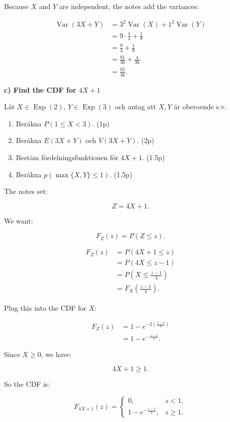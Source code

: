 \documentclass[10pt]{article}
\begin{document}
Because \(X\) and \(Y\) are independent,
the notes add the variances:

\begin{align*}
\operatorname{Var}(3X+Y)
&=3^2\operatorname{Var}(X)
  +1^2\operatorname{Var}(Y) \\[2mm]
&=9\cdot \frac{1}{4}
  +\frac{1}{9} \\[2mm]
&=\frac{9}{4}+\frac{1}{9} \\[2mm]
&=\frac{81}{36}
  +\frac{4}{36} \\[2mm]
&=\frac{85}{36}.
\end{align*}

\textbf{c) Find the CDF for \(4X+1\)}

Låt \(X \in \operatorname{Exp}(2)\),
\(Y \in \operatorname{Exp}(3)\) och antag att
\(X, Y\) är oberoende s.v.

\begin{enumerate}[label=\alph*)]
\item Beräkna \(P(1 \leq X < 3)\). \hfill (1p)
\item Beräkna \(E(3X+Y)\) och \(V(3X+Y)\). \hfill (2p)
\item Bestäm fördelningsfunktionen för \(4X+1\). \hfill (1.5p)
\item Beräkna \(p(\max\{X,Y\}\leq 1)\). \hfill (1.5p)
\end{enumerate}

The notes set:

\[
Z=4X+1.
\]

We want:

\[
F_Z(z)=P(Z\leq z).
\]

\begin{align*}
F_Z(z)
&=P(4X+1\leq z) \\[2mm]
&=P(4X\leq z-1) \\[2mm]
&=P\left(X\leq \frac{z-1}{4}\right) \\[2mm]
&=F_X\left(\frac{z-1}{4}\right).
\end{align*}

Plug this into the CDF for \(X\):

\begin{align*}
F_Z(z)
&=1-e^{-2\left(\frac{z-1}{4}\right)} \\[2mm]
&=1-e^{-\frac{z-1}{2}}.
\end{align*}

Since \(X\geq 0\), we have:

\[
4X+1\geq 1.
\]

So the CDF is:

\[
F_{4X+1}(z)=
\begin{cases}
0, & z<1,\\[1mm]
1-e^{-\frac{z-1}{2}},
& z\geq 1.
\end{cases}
\]
\end{document}
